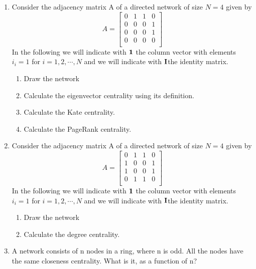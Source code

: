\documentclass{amsart}
\theoremstyle{definition}
\theoremstyle{remark}
\numberwithin{equation}{section}
\begin{document}
\clearpage
\begin{enumerate}


\item Consider the adjacency matrix A of a directed network of size $N = 4$ given by
\begin{equation*}
{A}  = \left\lbrack\begin{array}{cccc}
0 & 1 & 1& 0 \\
0 & 0 & 0& 1 \\
0 & 0 & 0& 1 \\
0& 0 & 0& 0 \\
\end{array}\right\rbrack
\end{equation*}
In the following we will indicate with ${\bf 1}$ the column vector with elements $i_i = 1$ for $i = 1, 2, \cdots, N$ and we will indicate with ${\bf I}$the identity matrix.
\begin{enumerate}
\item Draw the network
\item Calculate the eigenvector centrality using its definition.
\item Calculate the Kate centrality.
\item Calculate the PageRank centrality. 
\end{enumerate}
\clearpage

\item 
Consider the adjacency matrix A of a directed network of size $N = 4$ given by
\begin{equation*}
{A}  = \left\lbrack\begin{array}{cccc}
0 & 1 & 1& 0 \\
1 & 0 & 0& 1 \\
1& 0 & 0& 1 \\
0& 1 & 1& 0 \\
\end{array}\right\rbrack
\end{equation*}
In the following we will indicate with ${\bf 1}$ the column vector with elements $i_i = 1$ for $i = 1, 2, \cdots, N$ and we will indicate with ${\bf I}$the identity matrix.
\begin{enumerate}
\item Draw the network
\item Calculate the degree centrality.
\end{enumerate}
\clearpage
\item A network consists of n nodes in a ring, where n is odd. All the nodes have the same closeness centrality. What is it, as a function of n?


\end{enumerate}
\end{document}
